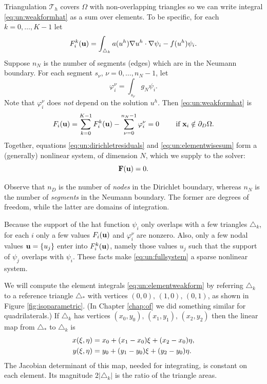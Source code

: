 Triangulation $\mathcal{T}_h$ covers $\Omega$ with non-overlapping triangles so we can write integral \eqref{eq:un:weakformhat} as a sum over elements.  To be specific, for each $k=0,\dots,K-1$ let
\begin{equation}
F_i^k(\mathbf{u}) = \int_{\triangle_k} a(u^h) \nabla u^h \cdot \nabla \psi_i - f(u^h) \psi_i.  \label{eq:un:elementweakform}
\end{equation}
Suppose $n_N$ is the number of segments (edges) which are in the Neumann boundary.  For each segment $s_\nu$, $\nu=0,\dots,n_N-1$, let
\begin{equation}
\varphi_i^\nu = \int_{s_\nu} g_N \psi_i.  \label{eq:un:segmentweakform}
\end{equation}
Note that $\varphi_i^\nu$ does \emph{not} depend on the solution $u^h$.  Then \eqref{eq:un:weakformhat} is
\begin{equation}
F_i(\mathbf{u}) = \sum_{k=0}^{K-1} F_i^k(\mathbf{u}) - \sum_{\nu=0}^{n_N-1} \varphi_i^\nu = 0  \qquad \text{ if } \mathbf{x}_i \notin \partial_D\Omega. \label{eq:un:elementwisesum}
\end{equation}
Together, equations \eqref{eq:un:dirichletresiduals} and \eqref{eq:un:elementwisesum} form a (generally) nonlinear system, of dimension $N$, which we supply to the \pSNES solver:
\begin{equation}
\mathbf{F}(\mathbf{u})=0. \label{eq:un:fullsystem}
\end{equation}

Observe that $n_D$ is the number of \emph{nodes} in the Dirichlet boundary, whereas $n_N$ is the number of \emph{segments} in the Neumann boundary.  The former are degrees of freedom, while the latter are domains of integration.

Because the support of the hat function $\psi_i$ only overlaps with a few triangles $\triangle_k$, for each $i$ only a few values $F_i(\mathbf{u})$ and $\varphi_i^\nu$ are nonzero.  Also, only a few nodal values $\mathbf{u}=\{u_j\}$ enter into $F_i^k(\mathbf{u})$, namely those values $u_j$ such that the support of $\psi_j$ overlaps with $\psi_i$.  These facts make \eqref{eq:un:fullsystem} a sparse nonlinear system.

We will compute the element integrals \eqref{eq:un:elementweakform} by referring $\triangle_k$ to a reference triangle $\triangle_\ast$ with vertices $(0,0),\,(1,0),\,(0,1)$, as shown in Figure \ref{fig:isoparametric}.  (In Chapter \ref{chap:of} we did something similar for quadrilaterals.)  If $\triangle_k$ has vertices $(x_0,y_0),\,(x_1,y_1),\,(x_2,y_2)$ then the linear map from $\triangle_\ast$ to $\triangle_k$ is
\begin{align}
x(\xi,\eta) &= x_0 + (x_1-x_0) \xi + (x_2-x_0) \eta, \label{eq:un:trianglemap} \\
y(\xi,\eta) &= y_0 + (y_1-y_0) \xi + (y_2-y_0) \eta. \notag
\end{align}
The Jacobian determinant of this map, needed for integrating, is constant on each element.  Its magnitude $2|\triangle_k|$ is the ratio of the triangle areas.

